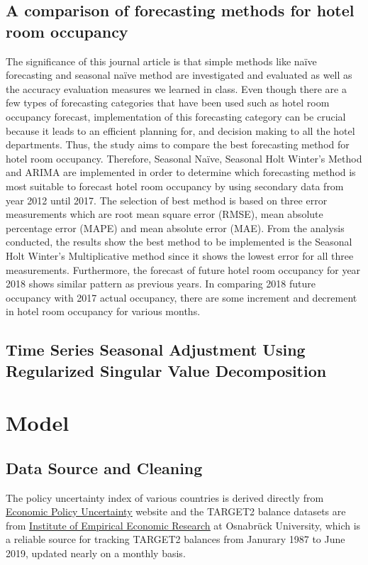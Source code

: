 \documentclass[12pt]{article}
\begin{document}
\subsection{A comparison of forecasting methods for hotel room occupancy}
The significance of this journal article is that simple methods like naïve forecasting and seasonal naïve method are investigated and evaluated as well as the accuracy evaluation measures we learned in class. Even though there are a few types of forecasting categories that have been used such as hotel room occupancy forecast, implementation of this forecasting category can be crucial because it leads to an efficient planning for, and decision making to all the hotel departments. Thus, the study aims to compare the best forecasting method for hotel room occupancy. Therefore, Seasonal Naïve, Seasonal Holt Winter’s Method and ARIMA are implemented in order to determine which forecasting method is most suitable to forecast hotel room occupancy by using secondary data from year 2012 until 2017. The selection of best method is based on three error measurements which are root mean square error (RMSE), mean absolute percentage error (MAPE) and mean absolute error (MAE). From the analysis conducted, the results show the best method to be implemented is the Seasonal Holt Winter’s Multiplicative method since it shows the lowest error for all three measurements. Furthermore, the forecast of future hotel room occupancy for year 2018 shows similar pattern as previous years. In comparing 2018 future occupancy with 2017 actual occupancy, there are some increment and decrement in hotel room occupancy for various months.

\subsection{Time Series Seasonal Adjustment Using Regularized Singular Value Decomposition}

\section{Model} \label{sec:model}
\subsection{Data Source and Cleaning}
The policy uncertainty index of various countries is derived directly from \href{https://www.policyuncertainty.com/monetary.html}{\underline{Economic Policy Uncertainty}} website and the TARGET2 balance datasets are from \href{http://www.eurocrisismonitor.com}{\underline{Institute of Empirical Economic Research}} at Osnabrück University, which is a reliable source for tracking TARGET2 balances from Janurary 1987 to June 2019, updated nearly on a monthly basis. 
\end{document}
